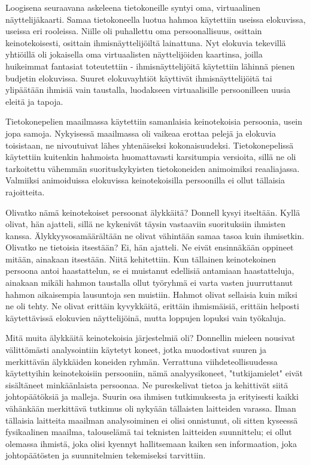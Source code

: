 Loogisena seuraavana askeleena tietokoneille syntyi oma, virtuaalinen näyttelijäkaarti. Samaa tietokoneella luotua hahmoa käytettiin useissa elokuvissa, useissa eri rooleissa. Niille oli puhallettu oma persoonallisuus, osittain keinotekoisesti, osittain ihmisnäyttelijöiltä lainattuna. Nyt elokuvia tekevillä yhtiöillä oli jokaisella oma virtuaalisten näyttelijöiden kaartinsa, joilla huikeimmat fantasiat toteutettiin - ihmisnäyttelijöitä käytettiin lähinnä pienen budjetin elokuvissa. Suuret elokuvayhtiöt käyttivät ihmisnäyttelijöitä tai ylipäätään ihmisiä vain taustalla, luodakseen virtuaalisille persoonilleen uusia eleitä ja tapoja.


Tietokonepelien maailmassa käytettiin samanlaisia keinotekoisia persoonia, usein jopa samoja. Nykyisessä maailmassa oli vaikeaa erottaa pelejä ja elokuvia toisistaan, ne nivoutuivat lähes yhtenäiseksi kokonaisuudeksi. Tietokonepelissä käytettiin kuitenkin hahmoista huomattavasti karsitumpia versioita, sillä ne oli tarkoitettu vähemmän suorituskykyisten tietokoneiden animoimiksi reaaliajassa. Valmiiksi animoiduissa elokuvissa keinotekoisilla persoonilla ei ollut tällaisia rajoitteita.


Olivatko nämä keinotekoiset persoonat älykkäitä? Donnell kysyi itseltään. Kyllä olivat, hän ajatteli, sillä ne kykenivät täysin vastaaviin suorituksiin ihmisten kanssa. Älykkyysosamäärältään ne olivat vähintään samaa tasoa kuin ihmisetkin. Olivatko ne tietoisia itsestään? Ei, hän ajatteli. Ne eivät ensinnäkään oppineet mitään, ainakaan itsestään. Niitä kehitettiin. Kun tällainen keinotekoinen persoona antoi haastattelun, se ei muistanut edellisiä antamiaan haastatteluja, ainakaan mikäli hahmon taustalla ollut työryhmä ei varta vasten juurruttanut hahmon aikaisempia lausuntoja sen muistiin. Hahmot olivat sellaisia kuin miksi ne oli tehty. Ne olivat erittäin kyvykkäitä, erittäin ihmismäisiä, erittäin helposti käytettävissä elokuvien näyttelijöinä, mutta loppujen lopuksi vain työkaluja.


Mitä muita älykkäitä keinotekoisia järjestelmiä oli? Donnellin mieleen nousivat välittömästi analysointiin käytetyt koneet, jotka muodostivat suuren ja merkittävän älykkäiden koneiden ryhmän. Verrattuna viihdeteollisuudessa käytettyihin keinotekoisiin persooniin, nämä analyysikoneet, "tutkijamielet" eivät sisältäneet minkäänlaista persoonaa. Ne pureskelivat tietoa ja kehittivät siitä johtopäätöksiä ja malleja. Suurin osa ihmisen tutkimuksesta ja erityisesti kaikki vähänkään merkittävä tutkimus oli nykyään tällaisten laitteiden varassa. Ilman tällaisia laitteita maailman analysoiminen ei olisi onnistunut, oli sitten kyseessä fysikaalinen maailma, talouselämä tai teknisten laitteiden suunnittelu; ei ollut olemassa ihmistä, joka olisi kyennyt hallitsemaan kaiken sen informaation, joka johtopäätösten ja suunnitelmien tekemiseksi tarvittiin.


